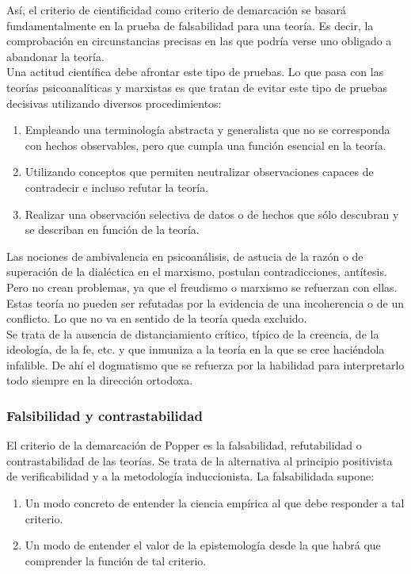 \documentclass[a4paper, 11pt, twocolumn, spanish]{article}
\begin{document}
Así, el criterio de cientificidad como criterio de demarcación se
basará fundamentalmente en la prueba de falsabilidad para una
teoría. Es decir, la comprobación en circunstancias precisas en las
que podría verse uno obligado a abandonar la teoría.\\[0pt]
Una actitud científica debe afrontar este tipo de pruebas. Lo que pasa
con las teorías psicoanalíticas y marxistas es que tratan de evitar
este tipo de pruebas decisivas utilizando diversos procedimientos:
\begin{enumerate}
\item Empleando una terminología abstracta y generalista que no se
corresponda con hechos observables, pero que cumpla una función
esencial en la teoría.
\item Utilizando conceptos que permiten neutralizar observaciones
capaces de contradecir e incluso refutar la teoría.
\item Realizar una observación selectiva de datos o de hechos que sólo
descubran y se describan en función de la teoría.
\end{enumerate}

Las nociones de ambivalencia en psicoanálisis, de astucia de la razón
o de superación de la dialéctica en el marxismo, postulan
contradicciones, antítesis. Pero no crean problemas, ya que el
freudismo o marxismo se refuerzan con ellas. Estas teoría no pueden
ser refutadas por la evidencia de una incoherencia o de un
conflicto. Lo que no va en sentido de la teoría queda excluido.\\[0pt]
Se trata de la ausencia de distanciamiento crítico, típico de la
creencia, de la ideología, de la fe, etc. y que inmuniza a la teoría
en la que se cree haciéndola infalible. De ahí el dogmatismo que se
refuerza por la habilidad para interpretarlo todo siempre en la
dirección ortodoxa.

\subsubsection{Falsibilidad y contrastabilidad}
\label{sec:org7e34f3f}
El criterio de la demarcación de Popper es la falsabilidad,
refutabilidad o contrastabilidad de las teorías. Se trata de la
alternativa al principio positivista de verificabilidad y a la
metodología induccionista. La falsabilidada supone:
\begin{enumerate}
\item Un modo concreto de entender la ciencia empírica al que debe
responder a tal criterio.
\item Un modo de entender el valor de la epistemología desde la que
habrá que comprender la función de tal criterio.
\end{enumerate}
\end{document}
